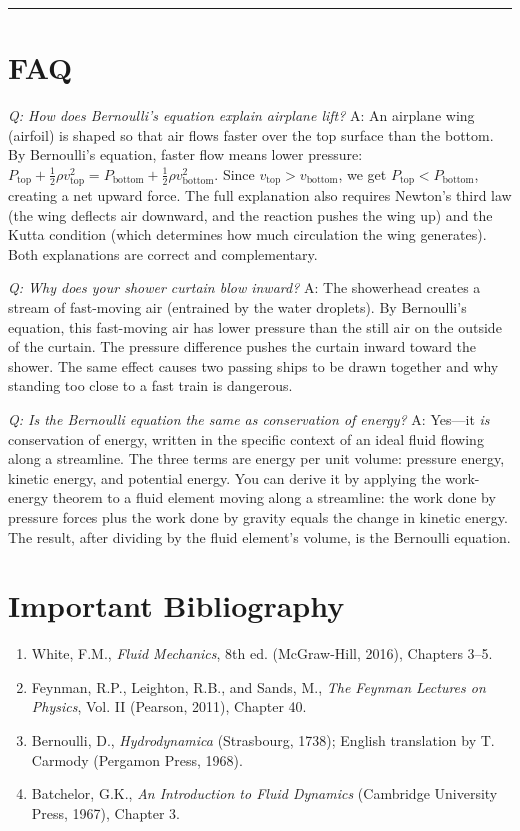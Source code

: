 \bigskip
\hrule
\bigskip
\section*{FAQ}

\textit{Q: How does Bernoulli's equation explain airplane lift?}
A: An airplane wing (airfoil) is shaped so that air flows faster over the top surface than the bottom. By Bernoulli's equation, faster flow means lower pressure: $P_{\text{top}} + \frac{1}{2}\rho v_{\text{top}}^2 = P_{\text{bottom}} + \frac{1}{2}\rho v_{\text{bottom}}^2$. Since $v_{\text{top}} > v_{\text{bottom}}$, we get $P_{\text{top}} < P_{\text{bottom}}$, creating a net upward force. The full explanation also requires Newton's third law (the wing deflects air downward, and the reaction pushes the wing up) and the Kutta condition (which determines how much circulation the wing generates). Both explanations are correct and complementary.

\textit{Q: Why does your shower curtain blow inward?}
A: The showerhead creates a stream of fast-moving air (entrained by the water droplets). By Bernoulli's equation, this fast-moving air has lower pressure than the still air on the outside of the curtain. The pressure difference pushes the curtain inward toward the shower. The same effect causes two passing ships to be drawn together and why standing too close to a fast train is dangerous.

\textit{Q: Is the Bernoulli equation the same as conservation of energy?}
A: Yes---it \emph{is} conservation of energy, written in the specific context of an ideal fluid flowing along a streamline. The three terms are energy per unit volume: pressure energy, kinetic energy, and potential energy. You can derive it by applying the work-energy theorem to a fluid element moving along a streamline: the work done by pressure forces plus the work done by gravity equals the change in kinetic energy. The result, after dividing by the fluid element's volume, is the Bernoulli equation.
\section*{Important Bibliography}
\begin{enumerate}
\item White, F.M., \textit{Fluid Mechanics}, 8th ed. (McGraw-Hill, 2016), Chapters 3--5.
\item Feynman, R.P., Leighton, R.B., and Sands, M., \textit{The Feynman Lectures on Physics}, Vol. II (Pearson, 2011), Chapter 40.
\item Bernoulli, D., \textit{Hydrodynamica} (Strasbourg, 1738); English translation by T. Carmody (Pergamon Press, 1968).
\item Batchelor, G.K., \textit{An Introduction to Fluid Dynamics} (Cambridge University Press, 1967), Chapter 3.
\end{enumerate}

